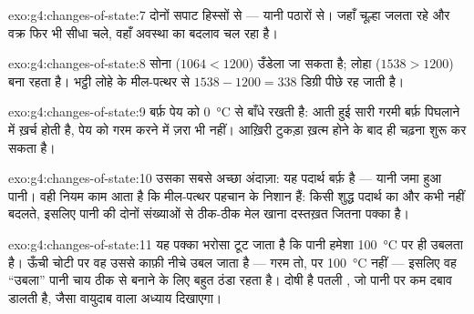 \begin{solution}{exo:g4:changes-of-state:7}
दोनों सपाट हिस्सों से --- यानी पठारों से। जहाँ चूल्हा जलता रहे और
वक्र फिर भी सीधा चले, वहाँ अवस्था का बदलाव चल रहा है।
\end{solution}

\begin{solution}{exo:g4:changes-of-state:8}
सोना ($1064 < 1200$) उँडेला जा सकता है; लोहा ($1538 > 1200$) 
बना रहता है। भट्ठी लोहे के मील-पत्थर से $1538 - 1200 = 338$ डिग्री
पीछे रह जाती है।
\end{solution}

\begin{solution}{exo:g4:changes-of-state:9}
 बर्फ़ पेय को \qty{0}{\celsius} से बाँधे रखती है: आती हुई सारी
गरमी बर्फ़ पिघलाने में ख़र्च होती है, पेय को गरम करने में ज़रा भी
नहीं। आख़िरी टुकड़ा ख़त्म होने के बाद ही  चढ़ना शुरू कर सकता है।
\end{solution}

\begin{solution}{exo:g4:changes-of-state:10}
उसका सबसे अच्छा अंदाज़ा: यह पदार्थ बर्फ़ है --- यानी जमा हुआ पानी।
वही नियम काम आता है कि मील-पत्थर पहचान के निशान हैं: किसी शुद्ध
पदार्थ का  और  कभी नहीं बदलते, इसलिए पानी की दोनों
संख्याओं से ठीक-ठीक मेल खाना दस्तख़त जितना पक्का है।
\end{solution}

\begin{solution}{exo:g4:changes-of-state:11}
यह पक्का भरोसा टूट जाता है कि पानी हमेशा \qty{100}{\celsius} पर ही
उबलता है। ऊँची चोटी पर वह उससे काफ़ी नीचे उबल जाता है --- गरम तो,
पर \qty{100}{\celsius} नहीं --- इसलिए वह ``उबला'' पानी चाय ठीक से
बनाने के लिए बहुत ठंडा रहता है। दोषी है पतली , जो पानी पर कम दबाव
डालती है, जैसा वायुदाब वाला अध्याय दिखाएगा।
\end{solution}
